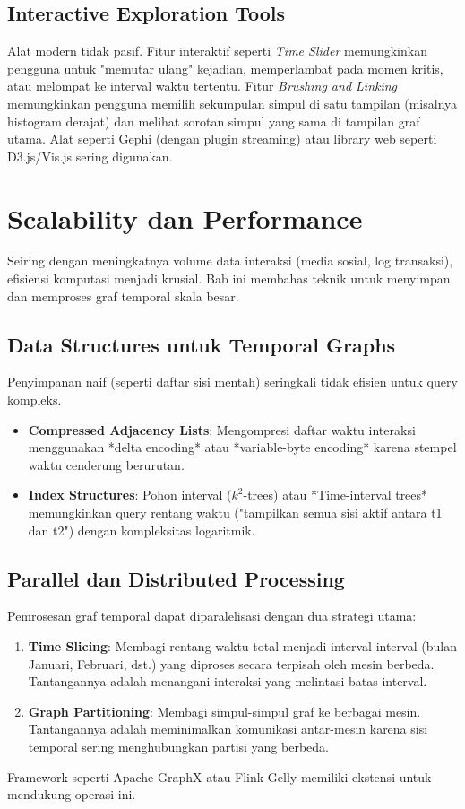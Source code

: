 \documentclass[12pt,a4paper]{book}
\begin{document}
\section{Interactive Exploration Tools}
Alat modern tidak pasif. Fitur interaktif seperti \textit{Time Slider} memungkinkan pengguna untuk "memutar ulang" kejadian, memperlambat pada momen kritis, atau melompat ke interval waktu tertentu. Fitur \textit{Brushing and Linking} memungkinkan pengguna memilih sekumpulan simpul di satu tampilan (misalnya histogram derajat) dan melihat sorotan simpul yang sama di tampilan graf utama. Alat seperti Gephi (dengan plugin streaming) atau library web seperti D3.js/Vis.js sering digunakan.

\chapter{Scalability dan Performance}
Seiring dengan meningkatnya volume data interaksi (media sosial, log transaksi), efisiensi komputasi menjadi krusial. Bab ini membahas teknik untuk menyimpan dan memproses graf temporal skala besar.

\section{Data Structures untuk Temporal Graphs}
Penyimpanan naif (seperti daftar sisi mentah) seringkali tidak efisien untuk query kompleks.
\begin{itemize}
    \item \textbf{Compressed Adjacency Lists}: Mengompresi daftar waktu interaksi menggunakan *delta encoding* atau *variable-byte encoding* karena stempel waktu cenderung berurutan.
    \item \textbf{Index Structures}: Pohon interval ($k^2$-trees) atau *Time-interval trees* memungkinkan query rentang waktu ("tampilkan semua sisi aktif antara t1 dan t2") dengan kompleksitas logaritmik.
\end{itemize}

\section{Parallel dan Distributed Processing}
Pemrosesan graf temporal dapat diparalelisasi dengan dua strategi utama:
\begin{enumerate}
    \item \textbf{Time Slicing}: Membagi rentang waktu total menjadi interval-interval (bulan Januari, Februari, dst.) yang diproses secara terpisah oleh mesin berbeda. Tantangannya adalah menangani interaksi yang melintasi batas interval.
    \item \textbf{Graph Partitioning}: Membagi simpul-simpul graf ke berbagai mesin. Tantangannya adalah meminimalkan komunikasi antar-mesin karena sisi temporal sering menghubungkan partisi yang berbeda.
\end{enumerate}
Framework seperti Apache GraphX atau Flink Gelly memiliki ekstensi untuk mendukung operasi ini.
\end{document}

